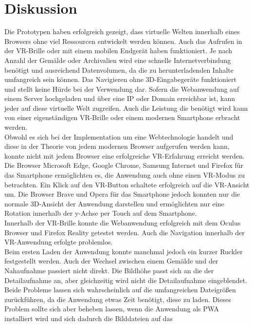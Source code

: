 \documentclass[a4paper,12pt,oneside]{article}
\begin{document}
  \section{Diskussion}
    Die Prototypen haben erfolgreich gezeigt, dass virtuelle Welten innerhalb
    eines Browsers ohne viel Ressourcen entwickelt werden können. Auch das
    Aufrufen in der VR-Brille oder mit einem mobilen Endgerät haben 
    funktioniert. Je nach Anzahl der Gemälde oder Archivalien wird
    eine schnelle Internetverbindung benötigt und ausreichend Datenvolumen,
    da die zu herunterladenden Inhalte umfangreich sein können. Das
    Navigieren ohne 3D-Eingabegeräte funktioniert und stellt keine Hürde
    bei der Verwendung dar.
    Sofern die Webanwendung auf einem Server hochgeladen und über eine IP
    oder Domain erreichbar ist, kann jeder auf diese virtuelle Welt zugreifen.
    Auch die Leistung die benötigt wird kann von einer eigenständigen
    VR-Brille oder einem modernen Smartphone erbracht werden. \\
    Obwohl es sich bei der Implementation um eine Webtechnologie handelt
    und diese in der Theorie von jedem modernen Browser aufgerufen werden
    kann, konnte nicht mit jedem Browser eine erfolgreiche VR-Erfahrung
    erreicht werden. Die Browser Microsoft Edge, Google Chrome, Samsung
    Internet und Firefox für das Smartphone ermöglichten es, die Anwendung 
    auch ohne einen VR-Modus zu betrachten. Ein Klick auf den VR-Button 
    schaltete erfolgreich
    auf die VR-Ansicht um. Die Browser Brave und Opera für das Smartphone 
    jedoch konnten nur
    die normale 3D-Ansicht der Anwendung darstellen und ermöglichten nur
    eine Rotation innerhalb der y-Achse per Touch auf dem Smartphone. \\
    Innerhalb der VR-Brille konnte die Webanwendung erfolgreich mit dem
    Oculus Browser und Firefox Reality getestet werden. Auch die Navigation
    innerhalb der VR-Anwendung erfolgte problemlos. \\
    Beim ersten Laden der
    Anwendung konnte manchmal jedoch ein kurzer Ruckler festgestellt werden.
    Auch der Wechsel zwischen einem Gemälde und der Nahaufnahme passiert 
    nicht direkt. Die Bildhöhe passt sich an die der Detailaufnahme an,
    aber gleichzeitig wird nicht die Detailaufnahme eingeblendet.
    Beide Probleme lassen sich wahrscheinlich auf die umfangreichen Dateigrößen
    zurückführen, da die Anwendung etwas Zeit benötigt, diese zu laden.
    Dieses Problem sollte sich aber beheben lassen, wenn die Anwendung
    als PWA installiert wird und sich dadurch die Bilddateien auf das
\end{document}
